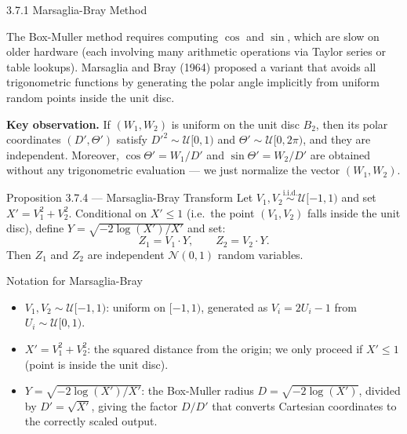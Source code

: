 \documentclass[aspectratio=169,10pt]{beamer}
\newcommand{\UU}{\mathcal{U}}
\newcommand{\NN}{\mathcal{N}}
\begin{document}
\begin{frame}[allowframebreaks]{3.7.1 Marsaglia-Bray Method}

The Box-Muller method requires computing $\cos$ and $\sin$, which are slow on
older hardware (each involving many arithmetic operations via Taylor series or
table lookups).  Marsaglia and Bray (1964) proposed a variant that avoids all
trigonometric functions by generating the polar angle implicitly from uniform
random points inside the unit disc.

\textbf{Key observation.}  If $(W_1, W_2)$ is uniform on the unit disc $B_2$,
then its polar coordinates $(D', \Theta')$ satisfy $D'^2 \sim \UU[0,1)$ and
$\Theta' \sim \UU[0, 2\pi)$, and they are independent.  Moreover,
$\cos\Theta' = W_1/D'$ and $\sin\Theta' = W_2/D'$ are obtained without
any trigonometric evaluation --- we just normalize the vector $(W_1, W_2)$.

\begin{block}{Proposition 3.7.4 --- Marsaglia-Bray Transform}
  Let $V_1, V_2 \stackrel{\text{i.i.d.}}{\sim} \UU[-1,1)$ and set $X' = V_1^2 + V_2^2$.
  Conditional on $X' \le 1$ (i.e.\ the point $(V_1, V_2)$ falls inside the unit disc),
  define $Y = \sqrt{-2\log(X')/X'}$ and set:
  \[
    Z_1 = V_1 \cdot Y, \qquad Z_2 = V_2 \cdot Y.
  \]
  Then $Z_1$ and $Z_2$ are independent $\NN(0,1)$ random variables.
\end{block}

\begin{block}{Notation for Marsaglia-Bray}
  \begin{itemize}
    \item $V_1, V_2 \sim \UU[-1,1)$: uniform on $[-1, 1)$, generated as
      $V_i = 2U_i - 1$ from $U_i \sim \UU[0,1)$.
    \item $X' = V_1^2 + V_2^2$: the squared distance from the origin;
      we only proceed if $X' \le 1$ (point is inside the unit disc).
    \item $Y = \sqrt{-2\log(X')/X'}$: the Box-Muller radius $D = \sqrt{-2\log(X')}$,
      divided by $D' = \sqrt{X'}$, giving the factor $D/D'$ that converts
      Cartesian coordinates to the correctly scaled output.
  \end{itemize}
\end{block}


\end{frame}
\end{document}
